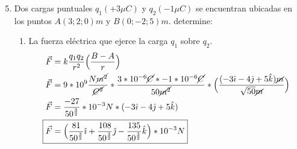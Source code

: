 \documentclass[12pt, twoside]{article}
\begin{document}
\begin{enumerate}
	\setcounter{enumi}{4}
	\item Dos cargas puntuales $q_1(+3\mu C)$ y $q_2(-1\mu C)$
		se encuentran ubicadas en los puntos $A(3;2;0)m$ y $B(0;-2;5)m$.
		determine:
		\begin{enumerate}
			\item La fuerza eléctrica que ejerce la carga $q_1$ sobre $q_2$.
				\begin{align*}
					\vec{F} &= k \frac{q_1q_2}{r^2} \Big{(} \frac{B-A}{r} \Big{)}\\
					\vec{F} &= 9*10^9 \frac{N\cancel{m^2}}{\cancel{C^2}}*
					\frac{3*10^{-6}\cancel{C}*-1*10^{-6}\cancel{C}}{50\cancel{m^2}}*
					\Big{(} \frac{(-3\hat{\imath}-4\hat{\jmath}+5\hat{k})\cancel{m}}{\sqrt{50}\cancel{m}} \Big{)}\\
					\vec{F} &= \frac{-27}{50^ \frac{3}{2} } *10^{-3} N*
					(-3\hat{\imath}-4\hat{\jmath}+5\hat{k})\\
					\Aboxed
					{
						\vec{F} &= \Big{(}
						\frac{81}{50^{ \frac{3}{2} }}\hat{\imath}+
						\frac{108}{50^{ \frac{3}{2} }}\hat{\jmath}-
						\frac{135}{50^{ \frac{3}{2} }}\hat{k}
						\Big{)}*10^{-3}N
					}
				\end{align*}


\end{enumerate}
\end{enumerate}
\end{document}
